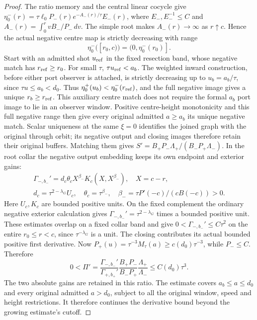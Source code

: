 \begin{proof}
The ratio memory and the central linear cocycle give
\(\eta_0^-(r)=\tau\ell_0P_-(r)e^{-A_-(r)/\tau}E_-(r)\),
where \(E_-,E_-^{-1}\le C\) and
\(A_-(r)=\int_0^r vB_-/P_-\,dv\).
The simple root makes \(A_-(r)\to\infty\) as \(r\uparrow c\).
Hence the actual negative centre map is strictly decreasing with range
\begin{equation}\label{deg:compact-negative-centre-image}
              \eta_0^-([r_0,c))=(0,\eta_0^-(r_0)].
\end{equation}
Start with an admitted shot \(u_{\rm ref}\) in the fixed resection
band, whose negative match has \(r_{\rm ref}\ge r_0\).
For small \(\tau\), \(\tau u_{\rm ref}<a_b\).
The weighted inward construction, before either port observer is
attached, is strictly decreasing up to \(u_b=a_b/\tau\), since
\(\tau u\le a_b<d_0\). Thus
\(\eta_0^+(u_b)<\eta_0^-(r_{\rm ref})\), and the full negative
image gives a unique \(r_b\ge r_{\rm ref}\).
This auxiliary centre match does not require the formal \(a_b\) port
image to lie in an observer window.
Positive centre-height monotonicity and this full negative range then
give every original admitted \(a\ge a_b\) its unique negative match.
Scalar uniqueness at the same \(\xi=0\) identifies the joined graph
with the original through orbit; its negative output and closing
images therefore retain their original buffers. Matching them
gives \(S'=B_+P_-\Lambda_+/(B_-P_+\Lambda_-)\).
In the root collar the negative output embedding keeps its own endpoint
and exterior gains:
\[
 \begin{gathered}
 \Gamma_{-,b_-}'=d_c\theta_cX^{\beta_-}K_c(X,X^{\beta_-}),\quad X=c-r,\\
 d_c=\tau^{2-\lambda_G}U_c,\quad\theta_c=\tau^{\beta_-},\quad
 \beta_-=\tau P'(-c)/(cB(-c))>0.
 \end{gathered}
\]
Here \(U_c,K_c\) are bounded positive units. On the fixed complement
the ordinary negative exterior calculation gives
\(\Gamma_{-,b_-}'=\tau^{2-\lambda_G}\) times a bounded positive
unit. These estimates overlap on a fixed collar band and give
\(0<\Gamma_{-,b_-}'\le C\tau^2\) on the entire \(r_0\le r<c\),
since \(\tau^{-\lambda_G}\) is a unit. The closing contributes its actual
bounded positive first derivative. Now \(P_+(u)=\tau^{-3}M_\tau(a)
\ge c(d_0)\tau^{-3}\), while \(P_-\le C\). Therefore
\begin{equation}\label{deg:compact-raw-tail-derivative}
 0<\Pi'=\frac{\Gamma_{-,b_-}'}{\Gamma_{+,b_+}'}
           \frac{B_+P_-}{B_-P_+}\frac{\Lambda_+}{\Lambda_-}
                       \le C(d_0)\tau^3.
\end{equation}
The two absolute gains are retained in this ratio. The estimate covers
\(a_b\le a\le d_0\) and every original admitted \(a>d_0\), subject
to all the original window, speed and height restrictions. It therefore
continues the derivative bound beyond the growing estimate's cutoff.


\end{proof}
